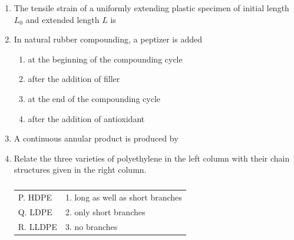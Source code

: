 \documentclass[a4paper,10pt]{article}
\begin{document}
\begin{enumerate}
    \item The tensile strain of a uniformly extending plastic specimen of initial length $L_0$ and extended length $L$ is
    
    \hfill{}
    \begin{enumerate}
    \end{enumerate}

    \item In natural rubber compounding, a peptizer is added
    
    \hfill{}
    \begin{enumerate}
        \item at the beginning of the compounding cycle
        \item after the addition of filler
        \item at the end of the compounding cycle
        \item after the addition of antioxidant
    \end{enumerate}

    \item A continuous annular product is produced by
    
    \hfill{}
    \begin{enumerate}
    \end{enumerate}

    \item Relate the three varieties of polyethylene in the left column with their chain structures given in the right column.
    \begin{table}[h!] \centering \caption*{} \label{tab:q7_polymer}
        \begin{tabular}{ll} \hline
            P. HDPE & 1. long as well as short branches \\
            Q. LDPE & 2. only short branches \\
            R. LLDPE & 3. no branches \\ \hline
        \end{tabular}
    \end{table}
    

\end{enumerate}
\end{document}
